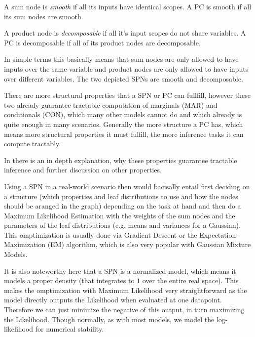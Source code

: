 \begin{definition}[Smoothness]
    A sum node is \textit{smooth} if all its inputs have identical scopes. A PC is smooth if all its sum nodes are smooth. \cite{pc_intro}
\end{definition}
\begin{definition}[Decomposability]
    A product node is \textit{decomposable} if all it's input scopes do not share variables. A PC is decomposable if all of its product nodes are decomposable. \cite{pc_intro}
\end{definition}

In simple terms this basically means that sum nodes are only allowed to have inputs over the same variable and product nodes are
only allowed to have inputs over different variables. The two depicted SPNs are smooth and decomposable.

There are more structural properties that a SPN or PC can fullfill, however these two already guarantee tractable computation of 
marginals (MAR) and conditionals (CON)\cite{pc_intro}, which many other models cannot do and which already is quite enough in many scenarios. 
Generally the more structure a PC has, which means more structural properties it must fulfill, the more inference tasks it can compute 
tractably. 

In \cite{pc_intro} there is an in depth explanation, why these properties guarantee tractable inference 
and further discussion on other properties.

Using a SPN in a real-world scenario then would bacisally entail first deciding on a structure (which properties and leaf 
distributions to use and how the nodes should be aranged in the graph) depending on the task at hand and then do a Maximum Likelihood 
Estimation with the weights of the sum nodes and the parameters of the leaf distributions (e.g. means and variances for a Gaussian). 
This omptimization is usually done via Gradient Descent or the Expectation-Maximization (EM) algorithm, 
which is also very popular with Gaussian Mixture Models. 

It is also noteworthy here that a SPN is a normalized model, which means it models a proper density (that integrates to $1$ over the entire real space). 
This makes the omptimization with Maximum Likelihood very straightforward as the model directly outputs the Likelihood when evaluated at one datapoint.
Therefore we can just minimize the negative of this output, in turn maximizing the Likelihood.
Though normally, as with most models, we model the log-likelihood for numerical stability.



